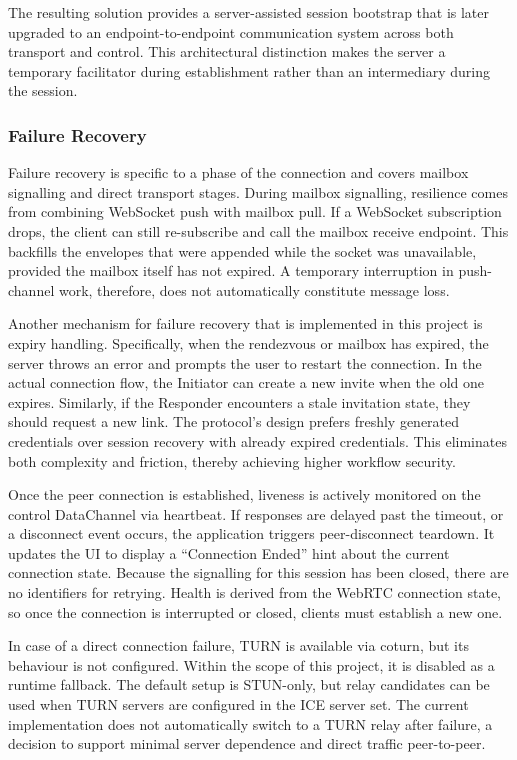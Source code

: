 \documentclass[12pt,a4paper]{article}
\begin{document}
The resulting solution provides a server-assisted session bootstrap that is later upgraded to an endpoint-to-endpoint communication system across both transport and control. This architectural distinction makes the server a temporary facilitator during establishment rather than an intermediary during the session.

\subsubsection{Failure Recovery}

Failure recovery is specific to a phase of the connection and covers mailbox signalling and direct transport stages. During mailbox signalling, resilience comes from combining WebSocket push with mailbox pull. If a WebSocket subscription drops, the client can still re-subscribe and call the mailbox receive endpoint. This backfills the envelopes that were appended while the socket was unavailable, provided the mailbox itself has not expired. A temporary interruption in push-channel work, therefore, does not automatically constitute message loss.

Another mechanism for failure recovery that is implemented in this project is expiry handling. Specifically, when the rendezvous or mailbox has expired, the server throws an error and prompts the user to restart the connection. In the actual connection flow, the Initiator can create a new invite when the old one expires. Similarly, if the Responder encounters a stale invitation state, they should request a new link. The protocol’s design prefers freshly generated credentials over session recovery with already expired credentials. This eliminates both complexity and friction, thereby achieving higher workflow security.

Once the peer connection is established, liveness is actively monitored on the control DataChannel via heartbeat. If responses are delayed past the timeout, or a disconnect event occurs, the application triggers peer-disconnect teardown. It updates the UI to display a “Connection Ended” hint about the current connection state. Because the signalling for this session has been closed, there are no identifiers for retrying. Health is derived from the WebRTC connection state, so once the connection is interrupted or closed, clients must establish a new one.

In case of a direct connection failure, TURN is available via coturn, but its behaviour is not configured. Within the scope of this project, it is disabled as a runtime fallback. The default setup is STUN-only, but relay candidates can be used when TURN servers are configured in the ICE server set. The current implementation does not automatically switch to a TURN relay after failure, a decision to support minimal server dependence and direct traffic peer-to-peer.
\end{document}
